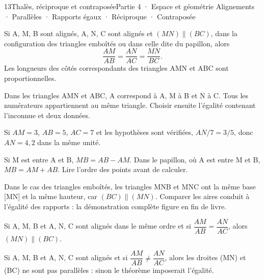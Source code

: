 \begin{ouverture}[geometrie]{13}{Thalès, réciproque et contraposée}{Partie 4 · Espace et géométrie}
{Alignements · Parallèles · Rapports égaux · Réciproque · Contraposée}
\end{ouverture}
\pagestyle{otMain}\essentiel\fontsize{11}{15}\selectfont
{}
\begin{propriete}Si A, M, B sont alignés, A, N, C sont alignés et $(MN)\parallel(BC)$, dans la configuration des triangles emboîtés ou dans celle dite du papillon, alors
\[\frac{AM}{AB}=\frac{AN}{AC}=\frac{MN}{BC}.\]
Les longueurs des côtés correspondants des triangles AMN et ABC sont proportionnelles.\end{propriete}
\begin{savoirfaire}Dans les triangles AMN et ABC, A correspond à A, M à B et N à C. Tous les numérateurs appartiennent au même triangle. Choisir ensuite l’égalité contenant l’inconnue et deux données.\end{savoirfaire}
\begin{exemple}Si $AM=3$, $AB=5$, $AC=7$ et les hypothèses sont vérifiées, $AN/7=3/5$, donc $AN=4{,}2$ dans la même unité.\end{exemple}
\begin{attention}Si M est entre A et B, $MB=AB-AM$. Dans le papillon, où A est entre M et B, $MB=AM+AB$. Lire l’ordre des points avant de calculer.\end{attention}
\begin{exemple}Dans le cas des triangles emboîtés, les triangles MNB et MNC ont la même base [MN] et la même hauteur, car $(BC)\parallel(MN)$. Comparer les aires conduit à l’égalité des rapports : la démonstration complète figure en fin de livre.\end{exemple}
\clearpage
{}
\begin{propriete}[Réciproque]Si A, M, B et A, N, C sont alignés dans le même ordre et si $\dfrac{AM}{AB}=\dfrac{AN}{AC}$, alors $(MN)\parallel(BC)$.\end{propriete}
\begin{propriete}[Contraposée]Si A, M, B et A, N, C sont alignés et si $\dfrac{AM}{AB}\ne\dfrac{AN}{AC}$, alors les droites (MN) et (BC) ne sont pas parallèles : sinon le théorème imposerait l’égalité.\end{propriete}
